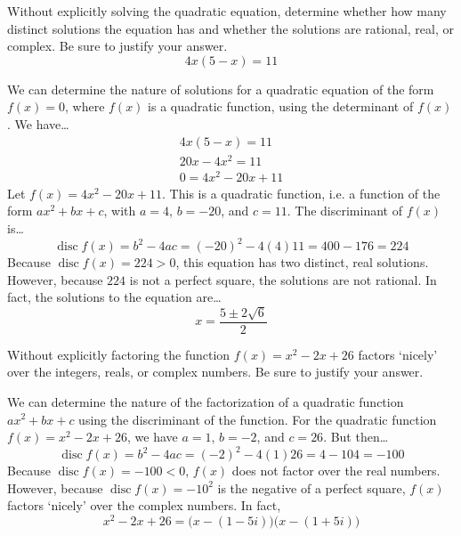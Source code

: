 \documentclass[11pt,letterpaper]{article}
\DeclareMathOperator{\disc}{disc}
\begin{document}

 Without explicitly solving the quadratic equation, determine whether how many distinct solutions the equation has and whether the solutions are rational, real, or complex. Be sure to justify your answer.
	\[
	4x(5 - x)= 11
	\] \pspace

\sol We can determine the nature of solutions for a quadratic equation of the form $f(x)= 0$, where $f(x)$ is a quadratic function, using the determinant of $f(x)$. We have\dots
	\[
	\begin{aligned}
	4x(5 - x)= 11 \\
	20x - 4x^2= 11 \\
	0= 4x^2 - 20x + 11
	\end{aligned}
	\]
Let $f(x)= 4x^2 - 20x + 11$. This is a quadratic function, i.e. a function of the form $ax^2 + bx + c$, with $a= 4$, $b= -20$, and $c= 11$. The discriminant of $f(x)$ is\dots
	\[
	\disc f(x)= b^2 - 4ac= (-20)^2 - 4(4)11= 400 - 176= 224
	\]
Because $\disc f(x)= 224 > 0$, this equation has two distinct, real solutions. However, because $224$ is not a perfect square, the solutions are not rational. In fact, the solutions to the equation are\dots
	\[
	x= \dfrac{5 \pm 2 \sqrt{6}}{2}
	\]



\newpage



 Without explicitly factoring the function $f(x)= x^2 - 2x + 26$ factors `nicely' over the integers, reals, or complex numbers. Be sure to justify your answer. \pspace

\sol We can determine the nature of the factorization of a quadratic function $ax^2 + bx + c$ using the discriminant of the function. For the quadratic function $f(x)= x^2 - 2x + 26$, we have $a= 1$, $b= -2$, and $c= 26$. But then\dots
	\[
	\disc f(x)= b^2 - 4ac= (-2)^2 - 4(1)26= 4 - 104= -100
	\]
Because $\disc f(x)= -100 < 0$, $f(x)$ does not factor over the real numbers. However, because $\disc f(x)= -10^2$ is the negative of a perfect square, $f(x)$ factors `nicely' over the complex numbers. In fact, 
	\[
	x^2 - 2x + 26= \big(x - (1 - 5i) \big) \big(x - (1 + 5i) \big)
	\]



\newpage
\end{document}
